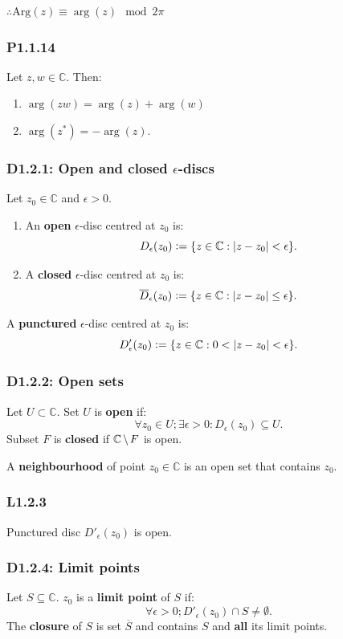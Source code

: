 \documentclass{article}
\newcommand{\deq}{\vcentcolon=}
\begin{document}
\begin{multicols*}{3}
$\therefore\text{Arg}(z)\equiv\arg(z)\mod 2\pi$

\subsubsection*{P1.1.14}
Let $z,w\in\mathbb{C}$. Then:
\begin{enumerate}
    \item $\arg(zw)=\arg(z)+\arg(w)$
    
    \item $\arg(z^*)=-\arg(z)$.
\end{enumerate}

\subsubsection*{D1.2.1: Open and closed $\epsilon$-discs}
Let $z_0\in\mathbb{C}$ and $\epsilon>0$.
\begin{enumerate}
    \item An \textbf{open} $\epsilon$-disc
    centred at $z_0$ is:
    $$D_{\epsilon}(z_0)
    \deq\{z\in\mathbb{C}:|z-z_0|<\epsilon\}.$$

    \item A \textbf{closed} $\epsilon$-disc
    centred at $z_0$ is:
    $$\overline{D}_{\epsilon}(z_0)
    \deq\{z\in\mathbb{C}:|z-z_0|\leq\epsilon\}.$$
\end{enumerate}
A \textbf{punctured} $\epsilon$-disc centred at $z_0$ is:
$$D'_{\epsilon}(z_0)\deq\{z\in\mathbb{C}:0<|z-z_0|<\epsilon\}.$$

\subsubsection*{D1.2.2: Open sets}
Let $U\subset\mathbb{C}$. Set $U$ is \textbf{open} if:
$$\forall z_0\in U;\exists\epsilon>0:D_{\epsilon}(z_0)\subseteq U.$$
Subset $F$ is \textbf{closed} if
$\mathbb{C}\hspace{0.02in}\backslash\hspace{0.02in} F$ is open.

A \textbf{neighbourhood} of point $z_0\in\mathbb{C}$
is an open set that contains $z_0$.

\subsubsection*{L1.2.3}
Punctured disc $D'_{\epsilon}(z_0)$ is open.

\subsubsection*{D1.2.4: Limit points}
Let $S\subseteq\mathbb{C}$. $z_0$ is a \textbf{limit point} of $S$ if:
$$\forall\epsilon>0; D'_{\epsilon}(z_0)\cap S\neq\emptyset.$$
The \textbf{closure} of $S$ is set $\overline{S}$ and contains $S$
and \textbf{all} its limit points.


\end{multicols*}
\end{document}
